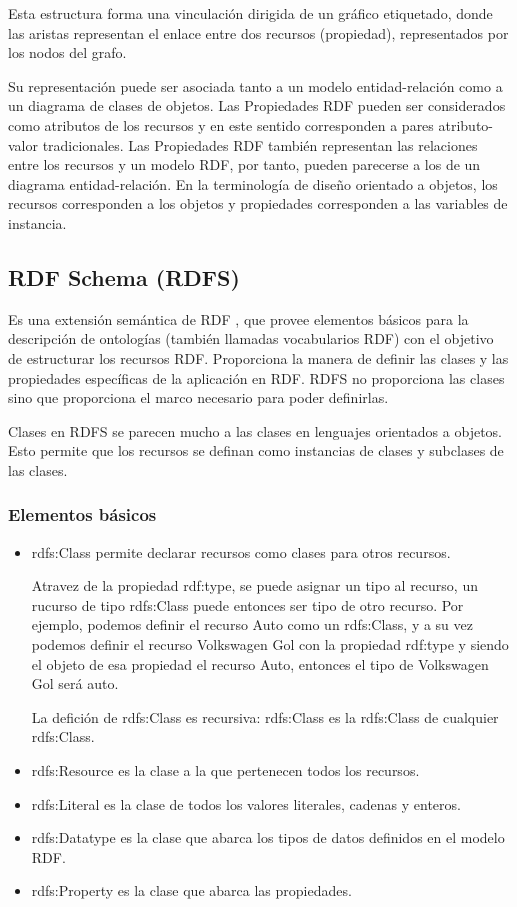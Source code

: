 Esta estructura forma una vinculación dirigida de un gráfico etiquetado, donde las aristas representan el enlace entre dos 
recursos (propiedad), representados por los nodos del grafo.

Su representación puede ser asociada tanto a un modelo entidad-relación como a un diagrama de clases de objetos.
Las Propiedades RDF pueden ser considerados como atributos de los recursos y en este sentido corresponden a pares 
atributo-valor tradicionales. Las Propiedades RDF también representan las relaciones entre los recursos y un modelo RDF,
por tanto, pueden parecerse a los de un diagrama entidad-relación.
En la terminología de diseño orientado a objetos, los recursos corresponden a los objetos y propiedades 
corresponden a las variables de instancia.

\subsection{RDF Schema (RDFS)}

Es una extensión semántica de RDF \cite{Guha2014}, que provee elementos básicos para la descripción de ontologías (también llamadas vocabularios RDF) con el objetivo
de estructurar los recursos RDF. Proporciona la manera de definir las clases y las propiedades específicas de la aplicación en RDF.
RDFS no proporciona las clases sino que proporciona el marco necesario para poder definirlas.

Clases en RDFS se parecen mucho a las clases en lenguajes orientados a objetos. Esto permite que los recursos se definan como 
instancias de clases y subclases de las clases.

\subsubsection{Elementos básicos}

\begin{itemize}
  \item 
    rdfs:Class permite declarar recursos como clases para otros recursos. 
    
    Atravez de la propiedad rdf:type, se puede asignar un tipo al recurso, un rucurso de tipo rdfs:Class puede entonces ser tipo de otro recurso. 
    Por ejemplo, podemos definir el recurso Auto como un rdfs:Class, y a su vez podemos definir el recurso Volkswagen Gol con la propiedad rdf:type 
    y siendo el objeto de esa propiedad el recurso Auto, entonces el tipo de Volkswagen Gol será auto.
    
    La defición de rdfs:Class es recursiva: rdfs:Class es la rdfs:Class de cualquier rdfs:Class.
  \item
    rdfs:Resource es la clase a la que pertenecen todos los recursos.
  \item
    rdfs:Literal es la clase de todos los valores literales, cadenas y enteros.
  \item
    rdfs:Datatype es la clase que abarca los tipos de datos definidos en el modelo RDF.
  \item
    rdfs:Property es la clase que abarca las propiedades.
\end{itemize}


